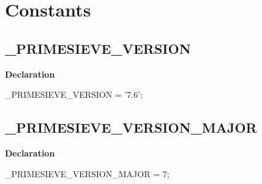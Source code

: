 \documentclass{report}
\newif\ifpdf
\begin{document}
\section{Constants}
\ifpdf
\subsection*{\large{\textbf{{\_}PRIMESIEVE{\_}VERSION}}\normalsize\hspace{1ex}\hrulefill}
\else
\subsection*{{\_}PRIMESIEVE{\_}VERSION}
\fi
\label{primesieve-_PRIMESIEVE_VERSION}
\begin{list}{}{
\setlength{\itemindent}{0cm}
\setlength{\listparindent}{0cm}
\setlength{\leftmargin}{\evensidemargin}
\addtolength{\leftmargin}{\tmplength}
\settowidth{\labelsep}{X}
\addtolength{\leftmargin}{\labelsep}
\setlength{\labelwidth}{\tmplength}
}
\item[\textbf{Declaration}\hfill]
\ifpdf
\begin{flushleft}
\fi
\begin{ttfamily}
{\_}PRIMESIEVE{\_}VERSION = '7.6';\end{ttfamily}

\ifpdf
\end{flushleft}
\fi

\end{list}
\ifpdf
\subsection*{\large{\textbf{{\_}PRIMESIEVE{\_}VERSION{\_}MAJOR}}\normalsize\hspace{1ex}\hrulefill}
\else
\subsection*{{\_}PRIMESIEVE{\_}VERSION{\_}MAJOR}
\fi
\label{primesieve-_PRIMESIEVE_VERSION_MAJOR}
\begin{list}{}{
\setlength{\itemindent}{0cm}
\setlength{\listparindent}{0cm}
\setlength{\leftmargin}{\evensidemargin}
\addtolength{\leftmargin}{\tmplength}
\settowidth{\labelsep}{X}
\addtolength{\leftmargin}{\labelsep}
\setlength{\labelwidth}{\tmplength}
}
\item[\textbf{Declaration}\hfill]
\ifpdf
\begin{flushleft}
\fi
\begin{ttfamily}
{\_}PRIMESIEVE{\_}VERSION{\_}MAJOR = 7;\end{ttfamily}

\ifpdf
\end{flushleft}
\fi

\end{list}
\ifpdf
\end{document}
